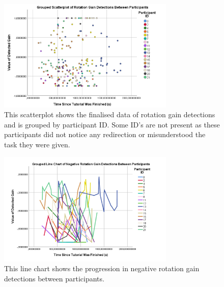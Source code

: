 \begin{figure}[tbph]
    \centering
    \includegraphics[width=0.75\textwidth]{figures/graphs/ProcessedRotationDetectionsByParticipant.png}
    \caption[Finalised Detection Scatterplot For Rotation Gains, Grouped by Participant ID]{This scatterplot shows the finalised data of rotation gain detections and is grouped by participant ID. Some ID's are not present as these participants did not notice any redirection or misunderstood the task they were given.}
    \label{fig:rotationDetectionDataByParticipant}
\end{figure}

\begin{figure}[tbph]
    \centering
    \includegraphics[width=0.75\textwidth]{figures/graphs/NegativeRotationDetectionsLineChart.png}
    \caption[Line Chart of Negative Rotation Gain Detections Between Participants]{This line chart shows the progression in negative rotation gain detections between participants.}
    \label{fig:negativeRotationDetectionLineChart}
\end{figure}

